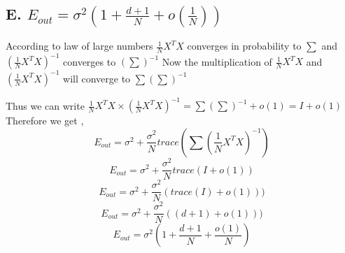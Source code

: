 \documentclass{article}
\begin{document}
\subsection{E. $E_{out} = \sigma^2(1 + \frac{d+1}{N} +o(\frac{1}{N}))$ }
According to law of large numbers 
$\frac{1}{N}X^T X$ converges in probability to $\sum$ and $(\frac{1}{N}X^T X)^{-1}$ converges to $(\sum)^{-1}$ 
Now the multiplication of $\frac{1}{N}X^T X$  and $(\frac{1}{N}X^T X)^{-1}$  will converge to $\sum(\sum)^{-1}$

Thus we can write  $\frac{1}{N}X^T X \times (\frac{1}{N}X^T X)^{-1} = \sum(\sum)^{-1} + o(1) = I + o(1)$ 
Therefore we get ,
$$E_{out} = \sigma^2 + \frac{\sigma^2}{N}trace(\sum (\frac{1}{N}X^TX)^{-1})$$ 
$$E_{out} = \sigma^2 + \frac{\sigma^2}{N}trace(I+o(1))$$ 
$$E_{out} = \sigma^2 + \frac{\sigma^2}{N}(trace(I)+o(1)))$$ 
$$E_{out} = \sigma^2 + \frac{\sigma^2}{N}((d+1)+o(1)))$$ 
$$E_{out} = \sigma^2(1 + \frac{d+1}{N}+\frac{o(1)}{N})$$ 





 
\end{document}
